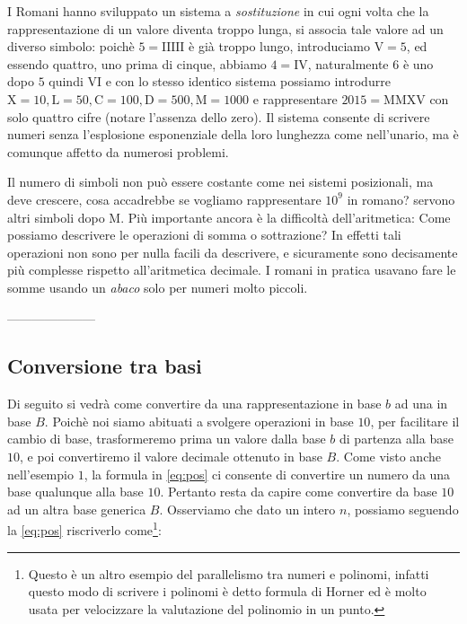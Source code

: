\documentclass[a4paper]{book}
\theoremstyle{definition}
\newcommand{\nota}[1]{\marginpar[{\raggedleft\small\sffamily #1\\}]{%
 								 {\raggedright\small\sffamily #1\\}}}
\begin{document}
{I Romani\nota{Numerazione Romana} hanno sviluppato un sistema a
\emph{sostituzione} in cui ogni volta che la rappresentazione di un valore
diventa troppo lunga, si associa tale valore ad un diverso simbolo: poichè $5 =
\mathrm{IIIII}$ è già troppo lungo, introduciamo $\mathrm{V} = 5$, ed essendo
quattro, uno prima di cinque, abbiamo $4 = \mathrm{IV}$, naturalmente $6$ è uno
dopo $5$ quindi $\mathrm{VI}$ e con lo stesso identico sistema possiamo
introdurre $\mathrm{X} = 10, \mathrm{L} = 50, \mathrm{C} = 100, \mathrm{D} =
500, \mathrm{M} = 1000$ e rappresentare $2015 = \mathrm{MMXV}$ con solo quattro
cifre (notare l'assenza dello zero). Il sistema consente di scrivere numeri
senza l'esplosione esponenziale della loro lunghezza come nell'unario, ma è
comunque affetto da numerosi problemi.

Il numero di simboli non può essere costante come nei sistemi posizionali, ma
deve crescere, cosa accadrebbe se vogliamo rappresentare $10^9$ in romano?
servono altri simboli dopo $\mathrm{M}$. Più importante ancora è la difficoltà
dell'aritmetica: Come possiamo descrivere le operazioni di somma o sottrazione?
In effetti tali operazioni non sono per nulla facili da descrivere, e
sicuramente sono decisamente più complesse rispetto all'aritmetica decimale. I
romani in pratica usavano fare le somme usando un \emph{abaco} solo per numeri
molto piccoli.\par }

---------------------

\subsection{Conversione tra basi}

Di seguito si vedrà come convertire da una rappresentazione in base $b$ ad una
in base $B$. Poichè noi siamo abituati a svolgere operazioni in base $10$, per
facilitare il cambio di base, trasformeremo prima un valore dalla base $b$ di
partenza alla base $10$, e poi convertiremo il valore decimale ottenuto in base
$B$. Come visto anche nell'esempio $1$, la formula in \eqref{eq:pos} ci
consente di convertire un numero da una base qualunque alla base $10$. Pertanto
resta da capire come convertire da base $10$ ad un altra base generica $B$.
Osserviamo che dato un intero $n$, possiamo seguendo la \eqref{eq:pos}
riscriverlo come\footnote{Questo è un altro esempio del parallelismo tra numeri e polinomi, infatti questo modo di scrivere i polinomi è detto formula di Horner ed è molto usata per velocizzare la valutazione del polinomio in un punto.}:
\end{document}
